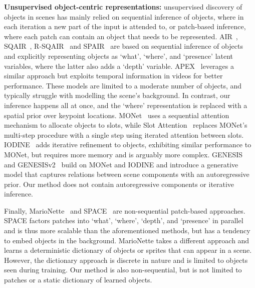\documentclass[nohyperref]{article}
\theoremstyle{plain}
\theoremstyle{definition}
\theoremstyle{remark}
\begin{document}
\textbf{Unsupervised object-centric representations:} unsupervised discovery of objects in scenes has mainly relied on sequential inference of objects, where in each iteration a new part of the input is attended to, or patch-based inference, where each patch can contain an object that needs to be represented. 
AIR~\citep{eslami2016attend}, SQAIR~\citep{kosiorek2018sequential}, R-SQAIR~\citep{stanic2019rsqair} and SPAIR~\citep{crawford2019spair} are based on sequential inference of objects and explicitly representing objects as ‘what’, ‘where’, and ‘presence’ latent variables, where the latter also adds a `depth' variable. APEX~\citep{wu2021apex} leverages a similar approach but exploits temporal information in videos for better performance.
These models are limited to a moderate number of objects, and typically struggle with modelling the scene's background. In contrast, our inference happens all at once, and the `where' representation is replaced with a spatial prior over keypoint locations.  
MONet~\citep{burgess2019monet} uses a sequential attention mechanism to allocate objects to slots, while Slot Attention~\citep{locatello2020object} replaces MONet's multi-step procedure with a single step using iterated attention between slots. IODINE~\citep{greff2019iodine} adds iterative refinement to objects, exhibiting similar performance to MONet, but requires more memory and is arguably more complex. GENESIS~\citep{engelcke2019genesis} and GENESISv2~\citep{engelcke2021genesis2}  build on MONet and IODINE and introduce a generative model that captures relations between scene components with an autoregressive prior. Our method does not contain autoregressive components or iterative inference.

Finally, MarioNette~\citep{smirnov2021marionette} and SPACE~\citep{lin2020space} are non-sequential patch-based approaches. SPACE factors patches into ‘what’, ‘where’, `depth', and ‘presence’ in parallel and is thus more scalable than the aforementioned methods, but has a tendency to embed objects in the background. MarioNette takes a different approach and learns a deterministic dictionary of objects or sprites that can appear in a scene. However, the dictionary approach is discrete in nature and is limited to objects seen during training. Our method is also non-sequential, but is not limited to patches or a static dictionary of learned objects.
\end{document}
